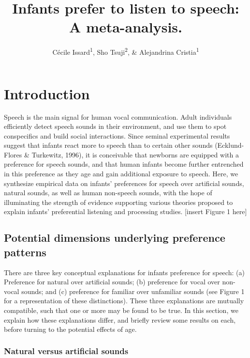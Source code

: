 \documentclass[man]{apa6}
\title{Infants prefer to listen to speech: A meta-analysis.}
\author{Cécile Issard\textsuperscript{1}, Sho Tsuji\textsuperscript{2}, \&
Alejandrina Cristia\textsuperscript{1}}
\date{}
\affiliation{
\vspace{0.5cm}
\textsuperscript{1} Laboratoire de Sciences Cognitives et Psycholinguistique, Ecole Normale Supérieure, Département d'Études Cognitives\\\textsuperscript{2} International Research Center for Neurointelligence, The University of Tokyo}
\begin{document}
\maketitle

\section{Introduction}\label{introduction}

Speech is the main signal for human vocal communication. Adult
individuals efficiently detect speech sounds in their environment, and
use them to spot conspecifics and build social interactions. Since
seminal experimental results suggest that infants react more to speech
than to certain other sounds (Ecklund-Flores \& Turkewitz, 1996), it is
conceivable that newborns are equipped with a preference for speech
sounds, and that human infants become further entrenched in this
preference as they age and gain additional exposure to speech. Here, we
synthesize empirical data on infants' preferences for speech over
artificial sounds, natural sounds, as well as human non-speech sounds,
with the hope of illuminating the strength of evidence supporting
various theories proposed to explain infants' preferential listening and
processing studies. {[}insert Figure 1 here{]}

\subsection{Potential dimensions underlying preference
patterns}\label{potential-dimensions-underlying-preference-patterns}

There are three key conceptual explanations for infants preference for
speech: (a) Preference for natural over artificial sounds; (b)
preference for vocal over non-vocal sounds; and (c) preference for
familiar over unfamiliar sounds (see Figure 1 for a representation of
these distinctions). These three explanations are mutually compatible,
such that one or more may be found to be true. In this section, we
explain how these explanations differ, and briefly review some results
on each, before turning to the potential effects of age.

\subsubsection{Natural versus artificial
sounds}\label{natural-versus-artificial-sounds}
\end{document}
